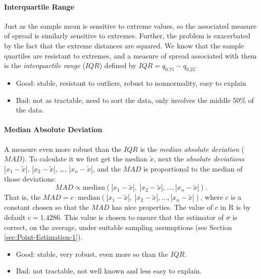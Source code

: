 \documentclass[captions=tableheading]{scrbook}
\begin{document}
\paragraph*{Interquartile Range}

Just as the sample mean is sensitive to extreme values, so the associated measure of spread is similarly sensitive to extremes. Further, the problem is exacerbated by the fact that the extreme distances are squared. We know that the sample quartiles are resistant to extremes, and a measure of spread associated with them is the \emph{interquartile range} (\(IQR\)) defined by \(IQR=q_{0.75}-q_{0.25}\).

\begin{itemize}
\item Good: stable, resistant to outliers, robust to nonnormality, easy to explain
\item Bad: not as tractable, need to sort the data, only involves the middle 50\% of the data.
\end{itemize}

\paragraph*{Median Absolute Deviation}

A measure even more robust than the \(IQR\) is the \emph{median absolute deviation} (\(MAD\)). To calculate it we first get the median \(\widetilde{x}\), next the \emph{absolute deviations} \(|x_{1}-\tilde{x}|\), \(|x_{2}-\tilde{x}|\), \ldots{}, \(|x_{n}-\tilde{x}|\), and the \(MAD\) is proportional to the median of those deviations:
\begin{equation}
MAD\propto\mbox{median}(|x_{1}-\tilde{x}|,\ |x_{2}-\tilde{x}|,\ldots,|x_{n}-\tilde{x}|).
\end{equation}
That is, the \(MAD=c\cdot\mbox{median}(|x_{1}-\tilde{x}|,\ |x_{2}-\tilde{x}|,\ldots,|x_{n}-\tilde{x}|)\), where \(c\) is a constant chosen so that the \(MAD\) has nice properties. The value of \(c\) in \textsf{R} is by default \(c=1.4286\). This value is chosen to ensure that the estimator of \(\sigma\) is correct, on the average, under suitable sampling assumptions (see Section \ref{sec:Point-Estimation-1}).
\begin{itemize}
\item Good: stable, very robust, even more so than the \(IQR\).
\item Bad: not tractable, not well known and less easy to explain.
\end{itemize}
\end{document}
